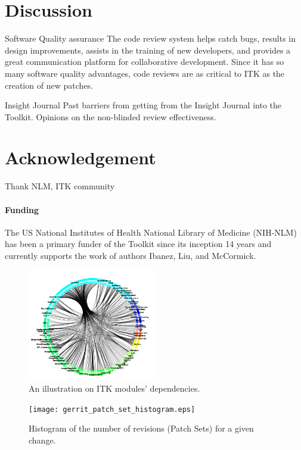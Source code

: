 \documentclass{frontiersENG} %
\begin{document}
\begin{enumeruate}
\section{Discussion}
Software Quality assurance
The code review system helps catch bugs, results in design improvements, assists in the training of new developers, and provides a great communication platform for collaborative development. Since it has so many software quality advantages, code reviews are as critical to ITK as the creation of new patches.


Insight Journal
Past barriers from getting from the Insight Journal into the Toolkit.  Opinions on the
non-blinded review effectiveness.



\section*{Acknowledgement}
Thank NLM, ITK community


\paragraph{Funding\textcolon} The US National Institutes of Health National Library of Medicine (NIH-NLM) has been a primary funder of the Toolkit since its inception 14 years and currently supports the work of authors Ibanez, Liu, and McCormick.




\begin{figure}
  \centering
    \includegraphics[width=0.5\textwidth]{itk_module_dependency.png}
    \caption{An illustration on ITK modules' dependencies.}
    \label{fig:itk_module_dependency}
\end{figure}

\begin{figure}
  \centering
    \texttt{[image: gerrit\_patch\_set\_histogram.eps]}
    \caption{Histogram of the number of revisions (Patch Sets) for a given change.}
    \label{fig:gerrit_patch_set_histogram}
\end{figure}


\end{enumeruate}
\end{document}
